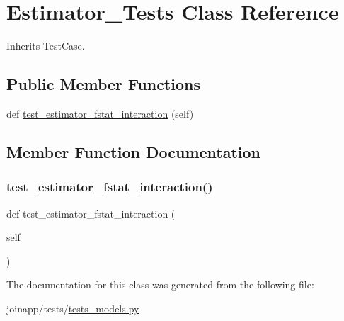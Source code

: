 \hypertarget{classjoinapp_1_1tests_1_1tests__models_1_1_estimator___tests}{}\section{Estimator\+\_\+\+Tests Class Reference}
\label{classjoinapp_1_1tests_1_1tests__models_1_1_estimator___tests}


Inherits Test\+Case.

\subsection*{Public Member Functions}
\begin{DoxyCompactItemize}
\item 
def \mbox{\hyperlink{classjoinapp_1_1tests_1_1tests__models_1_1_estimator___tests_af50e64ff84b21c0bb1399668efd9f96d}{test\+\_\+estimator\+\_\+fstat\+\_\+interaction}} (self)
\end{DoxyCompactItemize}


\subsection{Member Function Documentation}
\mbox{\label{classjoinapp_1_1tests_1_1tests__models_1_1_estimator___tests_af50e64ff84b21c0bb1399668efd9f96d}} 
\subsubsection{\texorpdfstring{test\_estimator\_fstat\_interaction()}{test\_estimator\_fstat\_interaction()}}
{\footnotesize\ttfamily def test\+\_\+estimator\+\_\+fstat\+\_\+interaction (\begin{DoxyParamCaption}\item[{}]{self }\end{DoxyParamCaption})}



The documentation for this class was generated from the following file\+:\begin{DoxyCompactItemize}
\item 
joinapp/tests/\mbox{\hyperlink{tests__models_8py}{tests\+\_\+models.\+py}}\end{DoxyCompactItemize}
